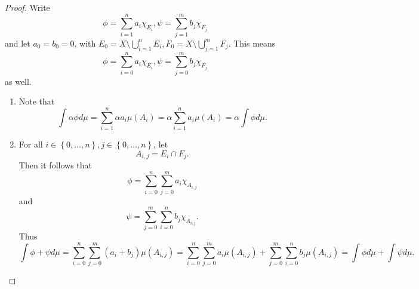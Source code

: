 \documentclass[pmath451]{subfiles}
\begin{document}
    \begin{proof}
        Write
        \begin{equation*}
            \phi = \sum^{n}_{i=1}a_i\chi_{E_i}, \psi = \sum^{m}_{j=1} b_j\chi_{F_j}
        \end{equation*}
        and let $a_0 = b_0 = 0$, with $E_0 = X\setminus \bigcup^{n}_{i=1}E_i, F_0 = X\setminus \bigcup^{m}_{j=1} F_j$. This means
        \begin{equation*}
            \phi = \sum^{n}_{i=0}a_i\chi_{E_i}, \psi = \sum^{m}_{j=0} b_j\chi_{F_j}
        \end{equation*}
        as well.
        \begin{enumerate}
            \item Note that 
                \begin{equation*}
                    \int\alpha\phi d\mu = \sum^{n}_{i=1}\alpha a_i\mu\left( A_i \right) = \alpha\sum^{n}_{i=1}a_i\mu\left( A_i \right) = \alpha\int\phi d\mu.
                \end{equation*}

            \item For all $i\in\left\lbrace 0,\ldots,n \right\rbrace, j\in\left\lbrace 0,\ldots,n \right\rbrace$, let
                \begin{equation*}
                    A_{i,j} = E_i\cap F_j.
                \end{equation*}
                Then it follows that
                \begin{equation*}
                    \phi = \sum^{n}_{i=0} \sum^{m}_{j=0} a_i\chi_{A_{i,j}}
                \end{equation*}
                and
                \begin{equation*}
                    \psi = \sum^{m}_{j=0} \sum^{n}_{i=0} b_j\chi_{A_{i,j}}.
                \end{equation*}
                Thus
                \begin{equation*}
                    \int\phi+\psi d\mu = \sum^{n}_{i=0} \sum^{m}_{j=0} \left( a_i+b_j \right)\mu\left( A_{i,j} \right) = \sum^{n}_{i=0} \sum^{m}_{j=0} a_i\mu\left( A_{i,j} \right) + \sum^{m}_{j=0} \sum^{n}_{i=0} b_j\mu\left( A_{i,j} \right) = \int\phi d\mu + \int\psi d\mu.
                \end{equation*}


\end{enumerate}
\end{proof}
\end{document}
